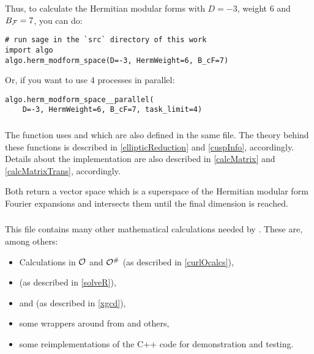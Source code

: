 Thus, to calculate the Hermitian modular forms with $D=-3$, weight $6$ and $B_{\mathcal{F}} = 7$, you can do:
\begin{lstlisting}
# run sage in the `src` directory of this work
import algo
algo.herm_modform_space(D=-3, HermWeight=6, B_cF=7)
\end{lstlisting}
Or, if you want to use 4 processes in parallel:
\begin{lstlisting}
algo.herm_modform_space__parallel(
    D=-3, HermWeight=6, B_cF=7, task_limit=4)
\end{lstlisting}

\subsubsection{}
The function  uses  and  which are also defined in the same file.
The theory behind these functions is described in \cref{ellipticReduction} and \cref{cuspInfo}, accordingly. Details about the implementation are also described in \cref{calcMatrix} and \cref{calcMatrixTrans}, accordingly.

Both return a vector space which is a superspace of the Hermitian modular form Fourier expansions and  intersects them until the final dimension is reached.

\subsubsection{}
This file contains many other mathematical calculations needed by . These are, among others:
\begin{itemize}
\item Calculations in $\mathcal{O}$ and $\mathcal{O}^\#$ (as described in \cref{curlOcalcs}),
\item {} (as described in \cref{solveR}),
\item {} and  (as described in \cref{xgcd}),
\item some wrappers around  from  and others,
\item some reimplementations of the C++ code for demonstration and testing.
\end{itemize}

